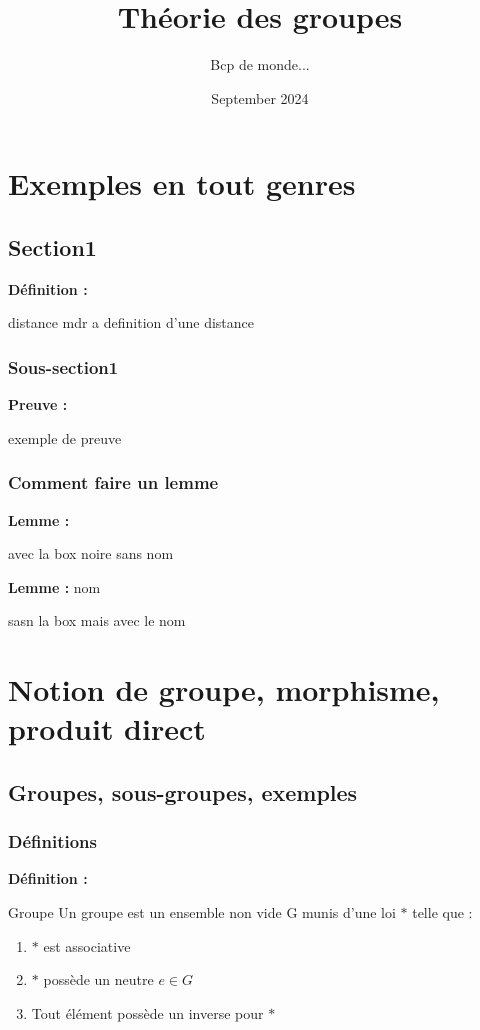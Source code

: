 \documentclass{report}
\title{Théorie des groupes}
\author{Bcp de monde... }
\date{September 2024}
\newenvironment{definition}[1][]{
    \begin{tcolorbox}[colframe= white]
    \textbf{Définition :} 
    #1 \par
    }
    {\end{tcolorbox}}
\newenvironment{preuve}{\begin{tcolorbox}[colframe= white]
    \textbf{Preuve :}
\par }
    {\end{tcolorbox}}
\newenvironment{lemme}[2][white]{\begin{tcolorbox}[colframe= #1]
    \textbf{Lemme :} #2  \par}
    {\end{tcolorbox}}
\begin{document}
\maketitle

\tableofcontents

\chapter*{Exemples en tout genres}



\section{Section1}
\begin{definition}{distance}
    mdr a definition d'une distance
\end{definition}
\subsection{Sous-section1}


\begin{preuve}
    exemple de preuve
\end{preuve}

\subsection{Comment faire un lemme}
\begin{lemme}[black]{}
avec la box noire sans nom
\end{lemme}

\begin{lemme}{nom}
    sasn la box mais avec le nom
\end{lemme}



\chapter{Notion de groupe, morphisme, produit direct}


\section{Groupes, sous-groupes, exemples}

\subsection{Définitions}
\begin{definition}{Groupe}
Un groupe est un ensemble non vide G munis d'une loi $\ast$ telle que :
\begin{enumerate}[label=(\roman*)]
\item $\ast$ est associative
\item $\ast$ possède un neutre $e\in G$
\item Tout élément possède un inverse pour $\ast$
\end{enumerate}

\end{definition}
\end{document}
